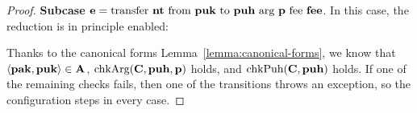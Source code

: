 \begin{proof}
  \bigskip\textbf{Subcase } $\EXPR =
  \TRANSFER[\PARAMETER]\NTEZ\PUK{\PUH}\MTEZ$. In this case, the
   reduction is in principle enabled:
  \begin{mathpar}
  \end{mathpar}
  Thanks to the canonical forms Lemma~\ref{lemma:canonical-forms}, we
  know that $\Angle{\PAK,\PUK} \in \ACCOUNTS$, $\CHECKARG
  (\CONTRACTORS, \PUH, \PARAMETER)$ holds, and $\CHECKPUH
  (\CONTRACTORS, \PUH)$ holds. If one of the remaining checks fails,
  then one of the  transitions throws an
  exception, so the configuration steps in every case. 


\end{proof}
